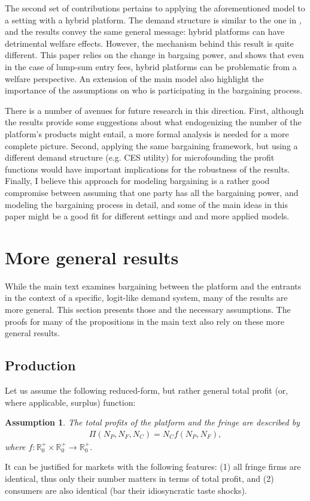 \documentclass[a4paper]{article}
\newtheorem{assumption}{Assumption}
\begin{document}
The second set of contributions pertains to applying the aforementioned model to a setting with a hybrid platform.
The demand structure is similar to the one in \textcite{anderson2021hybrid}, and the results convey the same general message: hybrid platforms can have detrimental welfare effects.
However, the mechanism behind this result is quite different.
This paper relies on the change in bargaing power, and shows that even in the case of lump-sum entry fees, hybrid platforms can be problematic from a welfare perspective.
An extension of the main model also highlight the importance of the assumptions on who is participating in the bargaining process.

There is a number of avenues for future research in this direction.
First, although the results provide some suggestions about what endogenizing the number of the platform's products might entail, a more formal analysis is needed for a more complete picture.
Second, applying the same bargaining framework, but using a different demand structure (e.g. CES utility) for microfounding the profit functions would have important implications for the robustness of the results.
Finally, I believe this approach for modeling bargaining is a rather good compromise between assuming that one party has all the bargaining power, and modeling the bargaining process in detail, and some of the main ideas in this paper might be a good fit for different settings and and more applied models.


\appendix

\printbibliography


\section{More general results}
\label{sec:more_general}

While the main text examines bargaining between the platform and the entrants in the context of a specific, logit-like demand system, many of the results are more general.
This section presents those and the necessary assumptions.
The proofs for many of the propositions in the main text also rely on these more general results.

\subsection{Production}
\label{sec:more_general_production}

Let us assume the following reduced-form, but rather general total profit (or, where applicable, surplus) function:
\begin{assumption}
    \label{ass:identical_fringe}
    The total profits of the platform and the fringe are described by 
    \begin{align*}
        \Pi(N_P, N_F, N_C) = N_C f(N_P, N_F),
    \end{align*}
    where $f: \mathbb{R}^+_0 \times \mathbb{R}^+_0 \to \mathbb{R}^+_0$.
\end{assumption}
It can be justified for markets with the following features: (1) all fringe firms are identical, thus only their number matters in terms of total profit, and (2) consumers are also identical (bar their idiosyncratic taste shocks).
\end{document}
